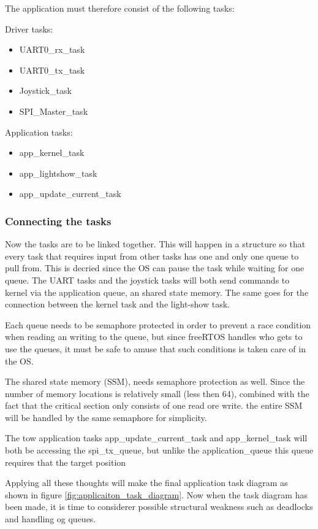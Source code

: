 The application must therefore consist of the following tasks:

Driver tasks:
\begin{itemize}[noitemsep]
	\item UART0\_rx\_task
	\item UART0\_tx\_task
	\item Joystick\_task
	\item SPI\_Master\_task
\end{itemize}

Application tasks:
\begin{itemize}[noitemsep]
	\item app\_kernel\_task
	\item app\_lightshow\_task
	\item app\_update\_current\_task
\end{itemize}	
	
\subsubsection{Connecting the tasks}
Now the tasks are to be linked together. This will happen in a structure so that every task that requires input from other tasks has one and only one queue to pull from. This is decried since the OS can pause the task while waiting for one queue. The UART tasks and the joystick tasks will both send commands to kernel via the application queue, an shared state memory. The same goes for the connection between the kernel task and the light-show task. 

Each queue needs to be semaphore protected in order to prevent a race condition when reading an writing to the queue, but since freeRTOS handles who gets to use the queues, it must be safe to amuse that such conditions is taken care of in the OS. 

The shared state memory (SSM), needs semaphore protection as well. Since the number of memory locations is relatively small (less then 64), combined with the fact that the critical section only consists of one read ore write. the entire SSM will be handled by the same semaphore for simplicity. 

The tow application tasks app\_update\_current\_task and app\_kernel\_task will both be accessing the spi\_tx\_queue, but unlike the application\_queue this queue requires that the target position

Applying all these thoughts will make the final application task diagram as shown in figure \ref{fig:applicaiton_task_diagram}. Now when the task diagram has been made, it is time to considerer possible structural weakness such as deadlocks and handling og queues. 

